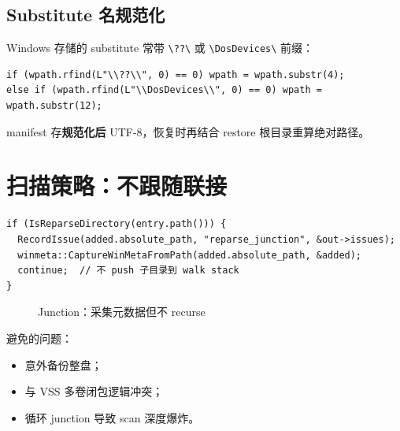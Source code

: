 \subsection{Substitute 名规范化}

Windows 存储的 substitute 常带 \texttt{\textbackslash??\textbackslash} 或 \texttt{\textbackslash DosDevices\textbackslash} 前缀：

\begin{lstlisting}[caption={NormalizeSubstituteName (win\_meta.cc)}]
if (wpath.rfind(L"\\??\\", 0) == 0) wpath = wpath.substr(4);
else if (wpath.rfind(L"\\DosDevices\\", 0) == 0) wpath = wpath.substr(12);
\end{lstlisting}

manifest 存\textbf{规范化后} UTF-8，恢复时再结合 restore 根目录重算绝对路径。

\section{扫描策略：不跟随联接}

\begin{lstlisting}[caption={Walk 层 junction 截断 (scan\_entry.cc)}]
if (IsReparseDirectory(entry.path())) {
  RecordIssue(added.absolute_path, "reparse_junction", &out->issues);
  winmeta::CaptureWinMetaFromPath(added.absolute_path, &added);
  continue;  // 不 push 子目录到 walk stack
}
\end{lstlisting}

\begin{figure}[htbp]
\centering
{}
\caption{Junction：采集元数据但不 recurse}
\end{figure}

避免的问题：
\begin{itemize}[nosep]
  \item 意外备份整盘；
  \item 与 VSS 多卷闭包逻辑冲突；
  \item 循环 junction 导致 scan 深度爆炸。
\end{itemize}

